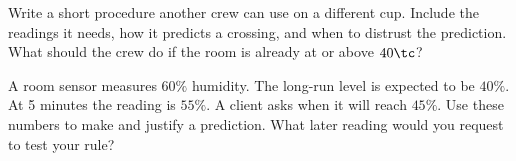 Write a short procedure another crew can use on a different cup. Include the readings it needs, how it predicts a crossing, and when to distrust the prediction. What should the crew do if the room is already at or above \(40\tc\)?

A room sensor measures \(60\%\) humidity. The long-run level is expected to be \(40\%\). At 5 minutes the reading is \(55\%\). A client asks when it will reach \(45\%\). Use these numbers to make and justify a prediction. What later reading would you request to test your rule?
